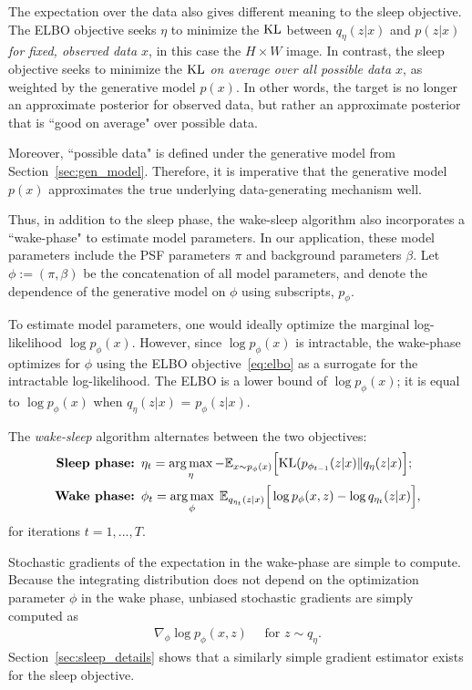 The expectation over the data also gives different meaning to the sleep objective. The ELBO objective seeks $\eta$ to minimize the $\textrm{KL}$ between $q_\eta(z | x)$ and $p(z | x)$ {\itshape for fixed, observed data $x$},
in this case the $H\times W$ image.
In contrast, the sleep objective seeks to minimize the $\textrm{KL}$ {\itshape on average over all possible data $x$}, as weighted by the generative model $p(x)$. 
In other words, the target is no longer an approximate posterior for observed data, but rather an approximate posterior that is ``good on average" over possible data.

Moreover, ``possible data" is defined under the generative model from Section~\ref{sec:gen_model}. Therefore, it is imperative that the generative model $p(x)$ approximates the true underlying data-generating mechanism well. 

Thus, in addition to the sleep phase, the wake-sleep algorithm also incorporates a ``wake-phase" to estimate model parameters.
In our application, these model parameters include the PSF parameters $\pi$ and background parameters $\beta$. Let 
$\phi:=(\pi, \beta)$ be the concatenation of all model parameters, and denote the dependence of the generative model on $\phi$ using subscripts, $p_\phi$. 

To estimate model parameters, one would ideally optimize the marginal log-likelihood $\log p_\phi(x)$.
However, since $\log p_\phi(x)$ is intractable, the wake-phase optimizes for $\phi$ using the ELBO objective~\eqref{eq:elbo}
as a surrogate for the intractable log-likelihood. 
The ELBO is a lower bound of
$\log p_\phi(x)$; 
it is equal to $\log p_\phi(x)$ when $q_\eta(z | x)$ 
= $p_\phi(z | x)$. 

The {\itshape wake-sleep} algorithm alternates between the two objectives: 
\begin{align}
    \text{{\bf Sleep phase: }} & 
    \eta_{t} = \operatorname*{arg\,max}_{\eta} -\mathbb{E}_{x \sim p_\phi(x)}\Big[\textrm{KL}(p_{\phi_{t-1}}(z | x) \| q_\eta(z | x)\Big]
    \label{eq:sleep_phase_summary}; 
    \\
    \text{{\bf Wake phase: }} & \phi_{t} = \operatorname*{arg\,max}_{\phi}\; \mathbb{E}_{q_{\eta_t}(z | x)}\Big[\log p_{\phi}(x, z) - \log q_{\eta_t}(z | x)\Big],
    \label{eq:wake_phase_summary}
\end{align} 
for iterations $t = 1, ..., T$. 

Stochastic gradients of the expectation in the wake-phase are simple to compute. Because the integrating distribution does not depend on the optimization parameter $\phi$ in the wake phase, unbiased stochastic gradients are simply computed as 
\begin{align}
    \nabla_\phi \log p_\phi(x, z) \quad \text{ for } z\sim q_\eta. 
    \label{eq:mstep_grad}
\end{align}
Section~\ref{sec:sleep_details} shows that a similarly simple gradient estimator exists for the sleep objective.



